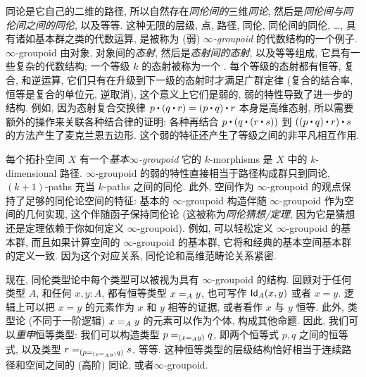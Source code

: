 同论是它自己的二维的路径, 所以自然存在\emph{同伦间的}三维\emph{同论}, 然后是\emph{同伦间与同伦间之间的同伦}, 以及等等. 这种无限的层级, 点, 路径, 同伦, 同伦间的同伦, \ldots, 具有诸如基本群之类的代数运算, 是被称为 (弱) \emph{$\infty$-groupoid} 的代数结构的一个例子. $\infty$-groupoid 由对象, 对象间的\emph{态射}, 然后是\emph{态射间的态射}, 以及等等组成, 它具有一些复杂的代数结构; 一个等级 $k$ 的态射被称为一个 . 每个等级的态射都有恒等, 复合, 和逆运算, 它们只有在升级到下一级的态射时才满足广群定律 (复合的结合率, 恒等是复合的单位元, 逆取消), 这个意义上它们是弱的, 弱的特性导致了进一步的结构. 例如, 因为态射复合交换律 $p \ct (q \ct r) = (p \ct q) \ct r$ 本身是高维态射, 所以需要额外的操作来关联各种结合律的证明: 各种再结合 $p \ct (q \ct (r \ct s))$ 到 $((p \ct q) \ct r) \ct s$ 的方法产生了麦克兰恩五边形. 这个弱的特征还产生了等级之间的非平凡相互作用. 

每个拓扑空间 $X$ 有一个\emph{基本$\infty$-groupoid} 
它的 $k$-mor\-ph\-isms 是 $X$ 中的 $k$-dimen\-sional 路径. $\infty$-group\-oid 的弱的特性直接相当于路径构成群只到同论, $(k+1)$-paths 充当 $k$-paths 之间的同伦. 此外, 空间作为 $\infty$-groupoid 的观点保持了足够的同伦论空间的特征: 基本的 $\infty$-groupoid 构造伴随 $\infty$-groupoid 作为空间的几何实现, 这个伴随函子保持同伦论 (这被称为\emph{同伦猜想/定理}, 
因为它是猜想 还是定理依赖于你如何定义 $\infty$-groupoid). 例如, 可以轻松定义 $\infty$-groupoid 的基本群, 而且如果计算空间的 $\infty$-groupoid 的基本群, 它将和经典的基本空间基本群的定义一致. 因为这个对应关系, 同伦论和高维范畴论关系紧密. 

%
%

\mentalpause

现在, 同伦类型论中每个类型可以被视为具有 $\infty$-groupoid 的结构. 回顾对于任何类型 $A$, 和任何 $x,y:A$, 都有恒等类型 $\id[A]{x}{y}$, 也可写作 $\idtype[A]{x}{y}$ 或者 $x=y$. 逻辑上可以把 $x=y$ 的元素作为 $x$ 和 $y$ 相等的证据, 或者看作 $x$ 与 $y$ 恒等. 此外, 类型论 (不同于一阶逻辑)  $\id[A]{x}{y}$ 的元素可以作为个体, 构成其他命题. 因此, 我们可以\emph{重申}恒等类型: 我们可以构造类型
 $\id[{(\id[A]{x}{y})}]{p}{q}$, 即两个恒等式 $p,q$ 之间的恒等式, 以及类型 $\id[{(\id[{(\id[A]{x}{y})}]{p}{q})}]{r}{s}$, 等等. 这种恒等类型的层级结构恰好相当于连续路径和空间之间的 (高阶) 同论, 或者$\infty$-groupoid. 


